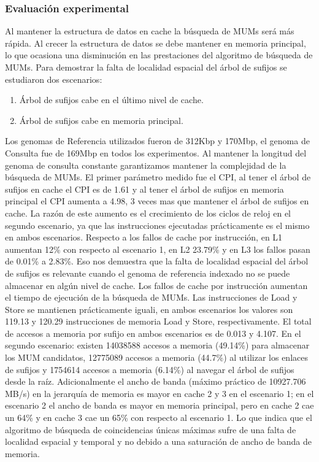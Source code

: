 \documentclass[12pt,a4paper]{article}
\begin{document}
\subsubsection{Evaluación experimental}
\indent
Al mantener la estructura de datos en cache la búsqueda de MUMs será más rápida. Al crecer la estructura de datos se debe mantener en memoria principal, lo que ocasiona una disminución en las prestaciones del algoritmo de búsqueda de MUMs.
Para demostrar la falta de localidad espacial del árbol de sufijos se estudiaron dos escenarios:
\begin{enumerate}
\item Árbol de sufijos cabe en el último nivel de cache.
\item Árbol de sufijos cabe en memoria principal.
\end{enumerate}
Los genomas de Referencia utilizados fueron de 312Kbp y 170Mbp, el genoma de Consulta fue de 169Mbp en todos los experimentos. Al mantener la longitud del genoma de consulta constante garantizamos mantener la complejidad de la búsqueda de MUMs.
El primer parámetro medido fue el CPI, al tener el árbol de sufijos en cache el CPI es de 1.61 y al tener el árbol de sufijos en memoria principal el CPI aumenta a 4.98, 3 veces mas que mantener el árbol de sufijos en cache. La razón de este aumento es el crecimiento de los ciclos de reloj en el segundo escenario, ya que las instrucciones ejecutadas prácticamente es el mismo en ambos escenarios.
Respecto a los fallos de cache por instrucción, en L1 aumentan 12\% con respecto al escenario 1, en L2 23.79\% y en L3 los fallos pasan de 0.01\% a 2.83\%. Eso nos demuestra que la falta de localidad espacial del árbol de sufijos es relevante cuando el genoma de referencia indexado no se puede almacenar en algún nivel de cache. Los fallos de cache por instrucci\'on aumentan el tiempo de ejecuci\'on de la b\'usqueda de MUMs. Las instrucciones de Load y Store se mantienen prácticamente iguali, en ambos escenarios los valores son 119.13 y 120.29 instrucciones de memoria Load y Store, respectivamente. El total de accesos a memoria por sufijo en ambos escenarios es de 0.013 y 4.107. En el segundo escenario: existen 14038588 accesos a memoria (49.14\%) para almacenar los MUM candidatos, 12775089 accesos a memoria (44.7\%) al utilizar los enlaces de sufijos y 1754614 accesos a memoria (6.14\%) al navegar el \'arbol de sufijos desde la ra\'iz. Adicionalmente el ancho de banda (m\'aximo pr\'actico de 10927.706 MB/s) en la jerarquía de memoria es mayor en cache 2 y 3 en el escenario 1; en el escenario 2 el ancho de banda es mayor en memoria principal, pero en cache 2 cae un 64\% y en cache 3 cae un 65\% con respecto al escenario 1. Lo que indica que el algoritmo de b\'usqueda de coincidencias \'unicas m\'aximas sufre de una falta de localidad espacial y temporal y no debido a una saturaci\'on de ancho de banda de memoria.
\end{document}
